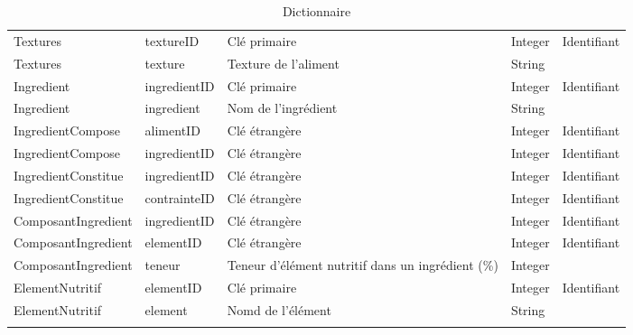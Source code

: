 \begin{longtable}{llp{5cm}ll}
  Textures & textureID & Clé primaire & Integer & Identifiant \\
  Textures & texture & Texture de l'aliment & String & \\ \hline
  Ingredient & ingredientID & Clé primaire & Integer & Identifiant \\
  Ingredient & ingredient & Nom de l'ingrédient & String &  \\ \hline
  IngredientCompose & alimentID & Clé étrangère & Integer & Identifiant \\
  IngredientCompose & ingredientID & Clé étrangère & Integer & Identifiant \\ \hline
  IngredientConstitue & ingredientID & Clé étrangère & Integer & Identifiant \\
  IngredientConstitue & contrainteID & Clé étrangère & Integer & Identifiant \\ \hline
  ComposantIngredient & ingredientID & Clé étrangère & Integer & Identifiant \\
  ComposantIngredient & elementID & Clé étrangère & Integer & Identifiant \\
  ComposantIngredient & teneur & Teneur d'élément nutritif dans un ingrédient (\%) & Integer & \\ \hline
  ElementNutritif & elementID & Clé primaire & Integer & Identifiant \\
  ElementNutritif & element & Nomd de l'élément & String &  \\ \hline
\caption{Dictionnaire}
\label{DictionnaireMDD}
\end{longtable}
